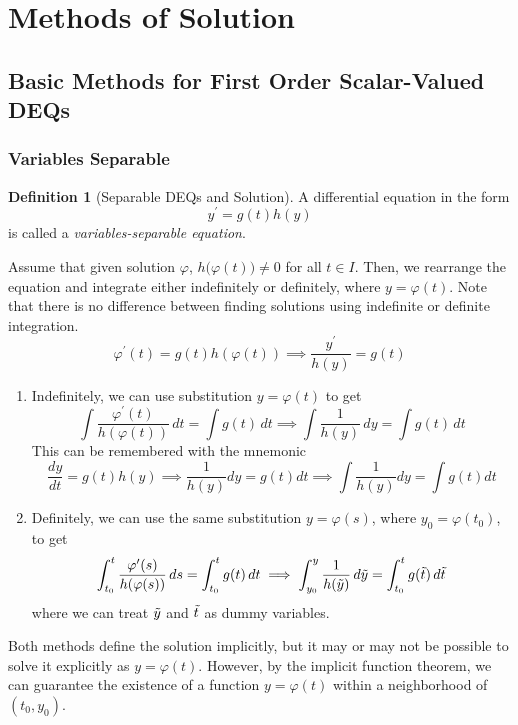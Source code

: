 \documentclass{article}
\theoremstyle{remark}
\theoremstyle{definition}
\newtheorem{definition}{Definition}[section]
\begin{document}
\section{Methods of Solution}

  \subsection{Basic Methods for First Order Scalar-Valued DEQs}

    \subsubsection{Variables Separable}

      \begin{definition}[Separable DEQs and Solution]
      A differential equation in the form
      \[y^\prime = g(t) h(y)\]
      is called a \textit{variables-separable equation}. 

      Assume that given solution $\varphi$, $h\big( \varphi(t)\big) \neq 0$ for all $t \in I$. Then, we rearrange the equation and integrate either indefinitely or definitely, where $y = \varphi(t)$. Note that there is no difference between finding solutions using indefinite or definite integration. 
      \[\varphi^\prime (t) = g(t) h(\varphi(t)) \implies \frac{y^\prime}{h(y)} = g(t)\]
      \begin{enumerate}
          \item Indefinitely, we can use substitution $y = \varphi(t)$ to get
          \[\int \frac{\varphi^\prime (t)}{h(\varphi(t))} \, dt = \int g (t) \, dt \implies \int \frac{1}{h(y)} \,dy = \int g(t)\,dt\]
          This can be remembered with the mnemonic
          \[\frac{dy}{dt} = g(t) h(y) \implies \frac{1}{h(y)} dy = g(t) dt \implies \int \frac{1}{h(y)} dy = \int g(t) dt\]
          \item Definitely, we can use the same substitution $y = \varphi(s)$, where $y_0 = \varphi(t_0)$, to get
          \[\int_{t_0}^t \frac{\varphi^\prime (s)}{h(\varphi(s))} \, ds = \int_{t_0}^t g(t)\, dt \implies \int_{y_0}^y \frac{1}{h(\Tilde{y})} \, d\Tilde{y} = \int_{t_0}^t g(\Tilde{t})\, d\Tilde{t}\]
          where we can treat $\Tilde{y}$ and $\Tilde{t}$ as dummy variables. 
      \end{enumerate}
      Both methods define the solution implicitly, but it may or may not be possible to solve it explicitly as $y = \varphi(t)$. However, by the implicit function theorem, we can guarantee the existence of a function $y = \varphi(t)$ within a neighborhood of $(t_0, y_0)$. 
      \end{definition}
\end{document}
